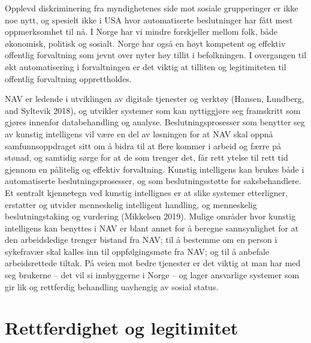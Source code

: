 \documentclass[
]{book}
\begin{document}
Opplevd diskriminering fra myndighetenes side mot sosiale grupperinger er ikke noe nytt, og spesielt ikke i USA hvor automatiserte beslutninger har fått mest oppmerksomhet til nå.
I Norge har vi mindre forskjeller mellom folk, både økonomisk, politisk og sosialt. Norge har også en høyt kompetent og effektiv offentlig forvaltning som jevnt over nyter høy tillit i befolkningen.
I overgangen til økt automatisering i forvaltningen er det viktig at tilliten og legitimiteten til offentlig forvaltning opprettholdes.

NAV er ledende i utviklingen av digitale tjenester og verktøy (Hansen, Lundberg, and Syltevik 2018), og utvikler systemer som kan nyttiggjøre seg framskritt som gjøres innenfor databehandling og analyse.
Beslutningsprosesser som benytter seg av kunstig intelligens vil være en del av løsningen for at NAV skal oppnå samfunnsoppdraget sitt om å bidra til at flere kommer i arbeid og færre på stønad, og samtidig sørge for at de som trenger det, får rett ytelse til rett tid gjennom en pålitelig og effektiv forvaltning.
Kunstig intelligens kan brukes både i automatiserte beslutningsprosesser, og som beslutningsstøtte for saksbehandlere.
Et sentralt kjennetegn ved kunstig intellignes er at slike systemer etterligner, erstatter og utvider menneskelig intelligent handling, og menneskelig beslutningstaking og vurdering (Mikkelsen 2019).
Mulige områder hvor kunstig intelligens kan benyttes i NAV er blant annet for å beregne sannsynlighet for at den arbeidsledige trenger bistand fra NAV; til å bestemme om en person i sykefravær skal kalles inn til oppfølgingsmøte fra NAV; og til å anbefale arbeidsrettede tiltak.
På veien mot bedre tjenester er det viktig at man har med seg brukerne -- det vil si innbyggerne i Norge -- og lager ansvarlige systemer som gir lik og rettferdig behandling uavhengig av sosial status.

\hypertarget{rettferdighet-og-legitimitet}{%
\section{Rettferdighet og legitimitet}\label{rettferdighet-og-legitimitet}}
\end{document}

